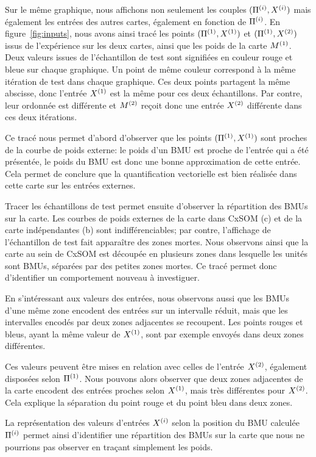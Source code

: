 Sur le même graphique, nous affichons non seulement les couples $(\Pi^{({i})},X^{({i})})$ mais également les entrées des autres cartes, également en fonction de $\Pi^{({i})}$.
En figure~\ref{fig:inputs}, nous avons ainsi tracé les points $(\Pi^{({1})},X^{({1})})$ et $(\Pi^{({1})},X^{({2})})$ issus de l'expérience sur les deux cartes, ainsi que les poids de la carte $M^{({1})}$.
Deux valeurs issues de l'échantillon de test sont signifiées en couleur rouge et bleue sur chaque graphique. Un point de même couleur correspond à la même itération de test dans chaque graphique. Ces deux points partagent la même abscisse, donc l'entrée $X^{({1})}$ est la même pour ces deux échantillons. Par contre, leur ordonnée est différente et $M^{({2})}$ reçoit donc une entrée $X^{({2})}$ différente dans ces deux itérations.

Ce tracé nous permet d'abord d'observer que les points $(\Pi^{({1})},X^{({1})})$ sont proches de la courbe de poids externe: le poids d'un BMU est proche de l'entrée qui a été présentée, le poids du BMU est donc une bonne approximation de cette entrée. Cela permet de conclure que la quantification vectorielle est bien réalisée dans cette carte sur les entrées externes.

Tracer les échantillons de test permet ensuite d'observer la répartition des BMUs sur la carte. Les courbes de poids externes de la carte dans CxSOM (c) et de la carte indépendantes (b) sont indifférenciables; par contre, l'affichage de l'échantillon de test fait apparaître des zones mortes. Nous observons ainsi que la carte au sein de CxSOM est découpée en plusieurs zones dans lesquelle les unités sont BMUs, séparées par des petites zones mortes. Ce tracé permet donc d'identifier un comportement nouveau à investiguer.


En s'intéressant aux valeurs des entrées, nous observons aussi que les BMUs d'une même zone encodent des entrées sur un intervalle réduit, mais que les intervalles encodés par deux zones adjacentes se recoupent. Les points rouges et bleus, ayant la même valeur de $X^{({1})}$, sont par exemple envoyés dans deux zones différentes.

Ces valeurs peuvent être mises en relation avec celles de l'entrée $X^{({2})}$, également disposées selon $\Pi^{({1})}$. Nous pouvons alors observer que deux zones adjacentes de la carte encodent des entrées proches selon $X^{({1})}$, mais très différentes pour $X^{({2})}$. Cela explique la séparation du point rouge et du point bleu dans deux zones.

La représentation des valeurs d'entrées $X^{({i})}$ selon la position du BMU calculée $\Pi^{({i})}$ permet ainsi d'identifier une répartition des BMUs sur la carte que nous ne pourrions pas observer en traçant simplement les poids.


